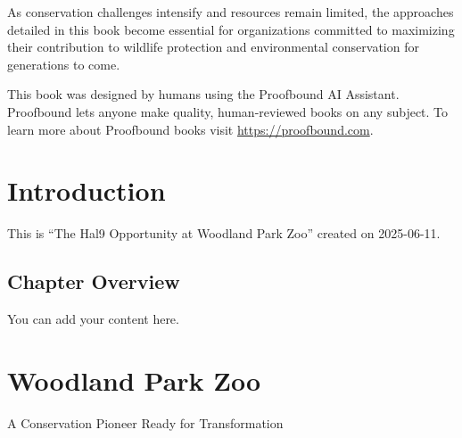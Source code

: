 \documentclass[
  Letterpaper,
]{scrbook}
\begin{document}
As conservation challenges intensify and resources remain limited, the
approaches detailed in this book become essential for organizations
committed to maximizing their contribution to wildlife protection and
environmental conservation for generations to come.

\begin{tcolorbox}[enhanced jigsaw, title=\textcolor{quarto-callout-note-color}{\faInfo}\hspace{0.5em}{About This Book}, colback=white, colframe=quarto-callout-note-color-frame, bottomtitle=1mm, colbacktitle=quarto-callout-note-color!10!white, coltitle=black, opacitybacktitle=0.6, toptitle=1mm, breakable, titlerule=0mm, arc=.35mm, opacityback=0, rightrule=.15mm, leftrule=.75mm, left=2mm, bottomrule=.15mm, toprule=.15mm]

This book was designed by humans using the Proofbound AI Assistant.
Proofbound lets anyone make quality, human-reviewed books on any
subject. To learn more about Proofbound books visit
\url{https://proofbound.com}.

\end{tcolorbox}


\chapter*{Introduction}\label{introduction}


This is ``The Hal9 Opportunity at Woodland Park Zoo'' created on
2025-06-11.

\section*{Chapter Overview}\label{chapter-overview}


You can add your content here.


\chapter{Woodland Park Zoo}\label{woodland-park-zoo}

A Conservation Pioneer Ready for Transformation
\end{document}

